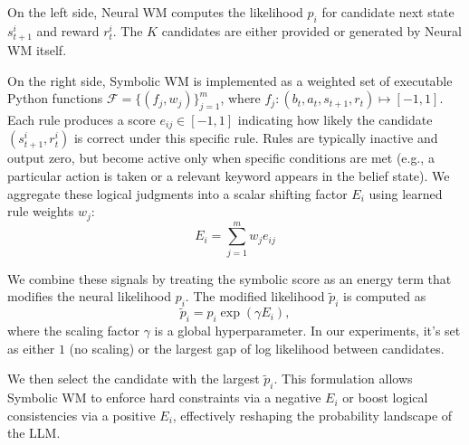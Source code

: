 \documentclass{article}
\theoremstyle{plain}
\theoremstyle{definition}
\theoremstyle{remark}
\begin{document}

On the left side, Neural WM computes the likelihood ${p_i}$ for candidate next state $s_{t+1}^{i}$ and reward $r_t^{i}$. The $K$ candidates are either provided or generated by Neural WM itself. 

On the right side, Symbolic WM is implemented as a weighted set of executable Python functions $\mathcal{F}=\{(f_j, w_j)\}_{j=1}^m$, where $f_j\!:\!(b_t,a_t,s_{t+1},r_t)\mapsto[-1,1]$. Each rule produces a score $e_{ij} \in [-1, 1]$ indicating how likely the candidate $(s_{t+1}^i,r_t^i)$ is correct under this specific rule. Rules are typically inactive and output zero, but become active only when specific conditions are met (e.g., a particular action is taken or a relevant keyword appears in the belief state). We aggregate these logical judgments into a scalar shifting factor $E_i$ using learned rule weights $w_j$: $$E_i = \sum_{j=1}^m w_j e_{ij}$$

We combine these signals by treating the symbolic score as an energy term that modifies the neural likelihood $p_i$. The modified likelihood $\tilde{p}_i$ is computed as 
\begin{equation*}
\tilde{p}_i = p_i\exp(\gamma E_i),
\end{equation*}
where the scaling factor $\gamma$ is a global hyperparameter. In our experiments, it's set as either $1$ (no scaling) or the largest gap of log likelihood between candidates. 

We then select the candidate with the largest $\tilde{p}_i$. This formulation allows Symbolic WM to enforce hard constraints via a negative $E_i$ or boost logical consistencies via a positive $E_i$, effectively reshaping the probability landscape of the LLM.
\end{document}
